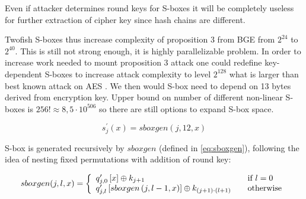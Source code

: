 \documentclass[11pt,oneside,final]{fithesis2}
\begin{document}
    Even if attacker determines round keys for S-boxes it will be completely useless for further extraction of cipher key since hash chains are different. 
    
    Twofish S-boxes thus increase complexity of proposition 3 from BGE from $2^{24}$ to $2^{40}$. This is still not strong enough, it is highly parallelizable problem.
    In order to increase work needed to mount proposition 3 attack one could redefine key-dependent S-boxes to increase attack complexity to level $2^{128}$ what is larger
    than best known attack on AES \citep{cryptoeprint:2011:449}. We then would S-box need to depend on 13 bytes derived from encryption key. Upper bound on number of different non-linear S-boxes is $256! \approx 8,5\cdot 10^{506}$ so there are still options to expand 
    S-box space. 
    
    \begin{equation}\label{eq:complex_sbox}
	s^{\prime}_{j}\left(x\right) = sboxgen(j,12,x)
    \end{equation}
    
    S-box is generated recursively by $sboxgen$ (defined in \ref{eq:sboxgen}), following the idea of nesting fixed permutations with addition of round key:
    
    \begin{equation}\label{eq:sboxgen}
	sboxgen(j,l,x) = \left\{ 
	\begin{array}{l l}  
	    q^{\prime}_{j,0}\left[ x \right]                          \oplus k_{j+1}		            & \quad \text{if $l=0$}\\
	    q^{\prime}_{j,l}\left[sboxgen\left(j, l-1,x\right)\right] \oplus k_{(j+1) \cdot (l+1)}          & \quad \text{otherwise}
	\end{array} \right.
    \end{equation}
    
\end{document}

